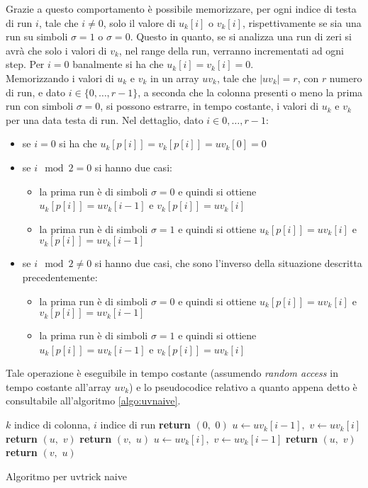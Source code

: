 Grazie a questo comportamento è possibile memorizzare, per ogni indice di
testa di run $i$, tale che $i\neq 0$, solo il valore di $u_k[i]$ o $v_k[i]$,
rispettivamente se sia una run su simboli $\sigma=1$ o $\sigma=0$. Questo in
quanto, se si analizza una run di zeri si avrà che solo i valori di $v_k$, nel
range della run, verranno incrementati ad ogni step. Per $i=0$ banalmente si ha
che $u_k[i]=v_k[i]=0$.\\
Memorizzando i valori di $u_k$ e $v_k$ in un array $uv_k$, tale che $|uv_k|=r$,
con $r$ numero di run, e dato $i\in\{0,\ldots, r-1\}$, a seconda che la colonna
presenti o meno la prima run  
con simboli $\sigma=0$, si possono estrarre, in tempo costante, i valori di
$u_k$ e $v_k$ per una data testa di run. Nel dettaglio, dato $i\in{0,\ldots,
  r-1}$:
\begin{itemize}
  \item se $i=0$ si ha che $u_k[p[i]]=v_k[p[i]]=uv_k[0]=0$
  \item se $i\mod 2 =0$ si hanno due casi:
  \begin{itemize}
    \item la prima run è di simboli $\sigma=0$ e quindi si ottiene
    $u_k[p[i]]=uv_k[i-1]$ e $v_k[p[i]]=uv_k[i]$
    \item la prima run è di simboli $\sigma=1$ e quindi si ottiene
    $u_k[p[i]]=uv_k[i]$ e $v_k[p[i]]=uv_k[i-1]$
  \end{itemize}
  \item se $i\mod 2 \neq 0$ si hanno due casi, che sono l'inverso della
  situazione descritta precedentemente:
  \begin{itemize}
    \item la prima run è di simboli $\sigma=0$ e quindi si ottiene
    $u_k[p[i]]=uv_k[i]$ e $v_k[p[i]]=uv_k[i-1]$
    \item la prima run è di simboli $\sigma=1$ e quindi si ottiene
    $u_k[p[i]]=uv_k[i-1]$ e $v_k[p[i]]=uv_k[i]$   
  \end{itemize}
\end{itemize}
Tale operazione è eseguibile in tempo costante (assumendo \textit{random access}
in tempo costante all'array $uv_k$) e lo pseudocodice relativo a
quanto appena detto è consultabile all'algoritmo \ref{algo:uvnaive}.\\
\begin{algorithm}
  \small
  \begin{algorithmic}[1]
    \Comment $k$ indice di colonna, $i$ indice di run
    \State \textbf{return} $(0,\,\,0)$
    \State $u\gets uv_k[i-1],\,\,v\gets uv_k[i]$
    \State \textbf{return} $(u,\,\,v)$
    \Else
    \State \textbf{return} $(v,\,\,u)$
    \EndIf
    \Else
    \State $u\gets uv_k[i],\,\,v\gets uv_k[i-1]$
    \State \textbf{return} $(u,\,\,v)$
    \Else
    \State \textbf{return} $(v,\,\,u)$
    \EndIf
    \EndIf
    \EndFunction
  \end{algorithmic}
  \caption{Algoritmo per uvtrick naive}
  \label{algo:uvnaive}
\end{algorithm}
